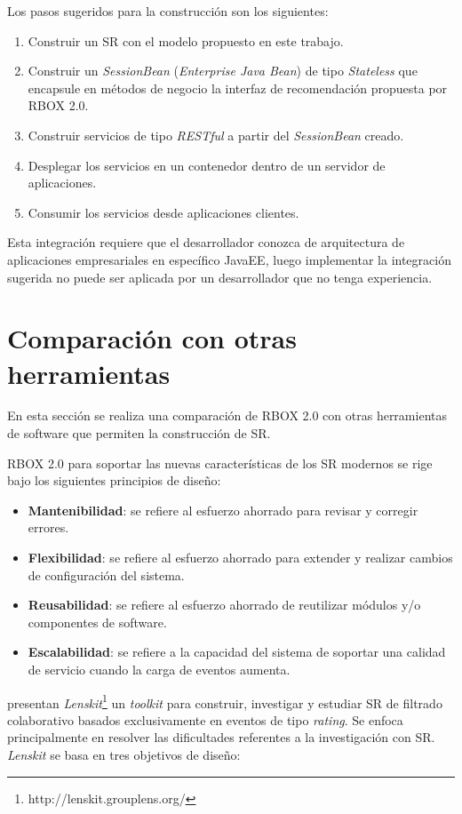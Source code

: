Los pasos sugeridos para la construcción son los siguientes:

\begin{enumerate}
\item Construir un SR con el modelo propuesto en este trabajo.
\item Construir un \textit{SessionBean} (\textit{Enterprise Java Bean}) de tipo \textit{Stateless} que encapsule en métodos de negocio la interfaz de recomendación propuesta por RBOX 2.0.
\item Construir servicios de tipo \textit{RESTful} a partir del \textit{SessionBean} creado.
\item Desplegar los servicios en un contenedor dentro de un servidor de aplicaciones.
\item Consumir los servicios desde aplicaciones clientes.
\end{enumerate} 

Esta integración requiere que el desarrollador conozca de arquitectura de aplicaciones empresariales en específico JavaEE, luego implementar la integración sugerida no puede ser aplicada por un desarrollador que no tenga experiencia.


\section{Comparación con otras herramientas}

En esta sección se realiza una comparación de RBOX 2.0 con otras herramientas de software que permiten la construcción de SR. 

RBOX 2.0 para soportar las nuevas características de los SR modernos se rige bajo los siguientes principios de diseño:
\begin{itemize}
	\item \textbf{Mantenibilidad}: se refiere al esfuerzo ahorrado para revisar y corregir errores.
	\item \textbf{Flexibilidad}: se refiere al esfuerzo ahorrado para extender y realizar cambios de configuración del sistema.
	\item \textbf{Reusabilidad}: se refiere al esfuerzo ahorrado de reutilizar módulos y/o componentes de software.
	\item \textbf{Escalabilidad}: se refiere a la capacidad del sistema de soportar una calidad de servicio cuando la carga de eventos aumenta.
\end{itemize}

\cite{Ekstrand:2011} presentan \textit{Lenskit}\footnote{http://lenskit.grouplens.org/} un \textit{toolkit} para construir, investigar y estudiar SR de filtrado colaborativo basados exclusivamente en eventos de tipo \textit{rating}. Se enfoca principalmente en resolver las dificultades referentes a la investigación con SR. \textit{Lenskit} se basa en tres objetivos de diseño:

